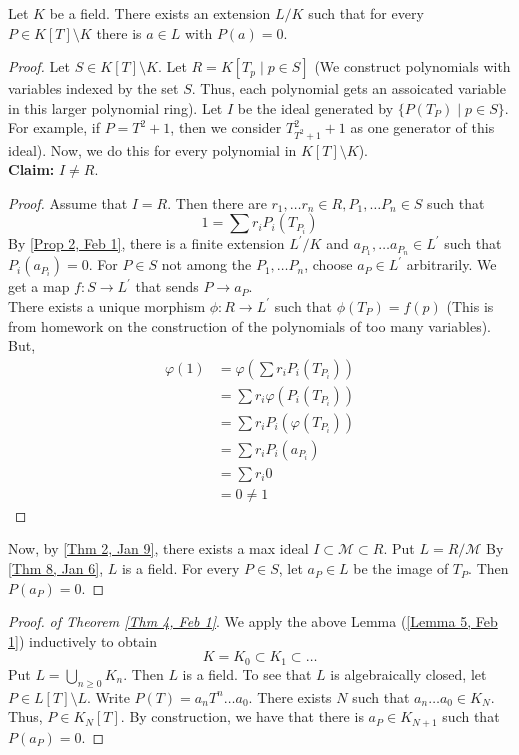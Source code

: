 \begin{lemma} \label{Lemma 5, Feb 1}
    Let $K$ be a field. There exists an extension $L / K$ such that for every
    $P \in K[T] \setminus K$ there is $a \in L$ with $P(a) = 0$.
\end{lemma}
\begin{proof}
    Let $S \in K[T] \setminus K$. Let $R = K[T_p \mid p \in S]$ (We construct polynomials
    with variables indexed by the set $S$. Thus, each polynomial gets an assoicated variable in this
    larger polynomial ring). Let $I$ be the ideal generated by $\{P(T_P) \mid p \in S \}$. For example,
    if $P = T^2 + 1$, then we consider $T_{T^2 + 1}^2 + 1$ as one generator of this ideal). Now,
    we do this for every polynomial in $K[T] \setminus K$). \\
    \textbf{Claim:} $I \neq R$. 
    \begin{proof}
        Assume that $I = R$. Then there are $r_1, \dots r_n \in R, P_1, \dots P_n \in S$
        such that
        $$
        1 = \sum{r_iP_i(T_{P_i})}
        $$
        By \ref{Prop 2, Feb 1}, there is a finite extension $L^\prime / K$ and $a_{P_1}, \dots
        a_{P_n} \in L^\prime$ such that $P_i(a_{P_i}) = 0$. For $P \in S$ not among the $P_1, \dots P_n$, choose
        $a_P \in L^\prime$ arbitrarily. We get a map $f:S \rightarrow L^\prime$ that sends
        $P \rightarrow a_P$. \\
        There exists a unique morphism $\phi: R \rightarrow L^\prime$ such that $\phi(T_P) = f(p)$ (This is
        from homework on the construction of the polynomials of too many variables). But,
        \begin{align*}
            \varphi(1) &= \varphi\left(\sum{r_iP_i(T_{P_i})}\right) \\
            &= \sum{r_i\varphi(P_i(T_{P_i}))} \\
            &= \sum{r_iP_i(\varphi(T_{P_i}))} \\
            &= \sum{r_iP_i(a_{P_i})} \\
            &= \sum{r_i0} \\
            &= 0 \neq 1
        \end{align*}
    \end{proof}
    Now, by \ref{Thm 2, Jan 9}, there exists a max ideal $I \subset \mathcal{M} \subset R$.
    Put $L = R / \mathcal{M}$ By \ref{Thm 8, Jan 6}, $L$ is a field. For every $P \in S$,
    let $a_P \in L$ be the image of $T_P$. Then $P(a_{P}) = 0$.
\end{proof}

\begin{proof}
    \textit{of Theorem \ref{Thm 4, Feb 1}}. We apply the above Lemma (\ref{Lemma 5, Feb 1}) inductively
    to obtain
    $$
    K = K_0 \subset K_1 \subset \dots
    $$
    Put $L = \bigcup_{n \geq 0}{K_n}$. Then $L$ is a field. To see that $L$ is algebraically
    closed, let $P \in L[T] \setminus L$. Write $P(T) = a_nT^n \dots a_0$.
    There exists $N$ such that $a_n \dots a_0 \in K_N$. Thus, $P \in K_N[T]$. By
    construction, we have that there is $a_P \in K_{N+1}$ such that $P(a_P) = 0$.
\end{proof}
